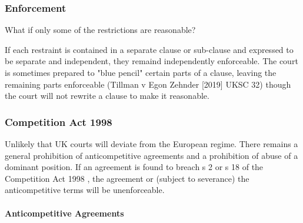 \documentclass[
]{article}
\newenvironment{env-b56569b0-a3e1-47fe-b37c-6cf3ba4ee6a2}
{
    \savenotes\tcolorbox[blanker,breakable,left=5pt,borderline west={2pt}{-4pt}{gray}]
}
{
    \endtcolorbox\spewnotes
}
\begin{document}
\hypertarget{enforcement}{%
\subsubsection{Enforcement}\label{enforcement}}

\begin{env-b56569b0-a3e1-47fe-b37c-6cf3ba4ee6a2}

What if only some of the restrictions are reasonable?

If each restraint is contained in a separate clause or sub-clause and
expressed to be separate and independent, they remaind independently
enforceable. The court is sometimes prepared to "blue pencil" certain
parts of a clause, leaving the remaining parts enforceable (Tillman v
Egon Zehnder {[}2019{]} UKSC 32) though the court will not rewrite a
clause to make it reasonable.

\end{env-b56569b0-a3e1-47fe-b37c-6cf3ba4ee6a2}

\hypertarget{competition-act-1998}{%
\subsubsection{Competition Act 1998}\label{competition-act-1998}}

Unlikely that UK courts will deviate from the European regime. There
remains a general prohibition of anticompetitive agreements and a
prohibition of abuse of a dominant position. If an agreement is found to
breach s 2 or s 18 of the Competition Act 1998 , the agreement or
(subject to severance) the anticompetitive terms will be unenforceable.

\hypertarget{anticompetitive-agreements}{%
\paragraph{Anticompetitive
Agreements}\label{anticompetitive-agreements}}
\end{document}
